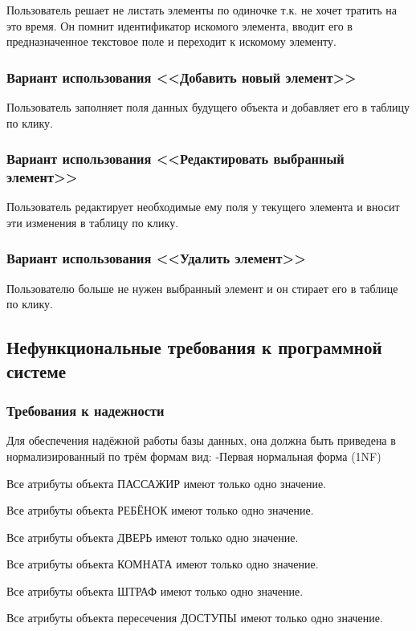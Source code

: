 Пользователь решает не листать элементы по одиночке т.к. не хочет тратить на это время. Он помнит идентификатор искомого элемента, вводит его в предназначенное текстовое поле и переходит к искомому элементу.

\subsubsection{Вариант использования <<Добавить новый элемент>>}

Пользователь заполняет поля данных будущего объекта и добавляет его в таблицу по клику.

\subsubsection{Вариант использования <<Редактировать выбранный элемент>>}

Пользователь редактирует необходимые ему поля у текущего элемента и вносит эти изменения в таблицу по клику.

\subsubsection{Вариант использования <<Удалить элемент>>}

Пользователю больше не нужен выбранный элемент и он стирает его в таблице по клику.

\subsection {Нефункциональные требования к программной системе}
\subsubsection{Требования к надежности}
Для обеспечения надёжной работы базы данных, она должна быть приведена в нормализированный по трём формам вид:
-Первая нормальная форма (1NF)

Все атрибуты объекта ПАССАЖИР имеют только одно значение.

Все атрибуты объекта РЕБЁНОК имеют только одно значение.

Все атрибуты объекта ДВЕРЬ имеют только одно значение.

Все атрибуты объекта КОМНАТА имеют только одно значение.

Все атрибуты объекта ШТРАФ имеют только одно значение.

Все атрибуты объекта пересечения ДОСТУПЫ имеют только одно значение.

